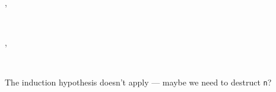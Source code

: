 \documentclass[a4paper]{article}
\begin{document}
\begin{alectryon}
\begin{sentence}
\begin{output}
\begin{goals}
\begin{goal}
\begin{conclusion}
          \end{conclusion}
        \end{goal}
      \end{goals}
    \end{output}
  \end{sentence}
  \sep
  \begin{sentence}
    \begin{input}
      ~~~~~~
    \end{input}
    \sep
    \begin{output}
      \begin{messages}
        \begin{message}
          ~\nl
          ~~\nl
          ~~~~~~~~\nl
          ~~~~~~~~\nl
          ~~~~\nl
          ~
        \end{message}
      \end{messages}
    \end{output}
  \end{sentence}
\end{alectryon}

The induction hypothesis doesn't apply — maybe we need to destruct \texttt{n}?
\end{document}
